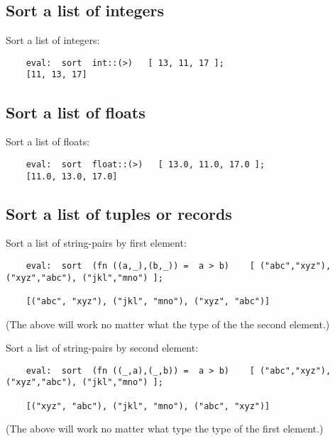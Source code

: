 \cutend*

\subsection{Sort a list of integers}

Sort a list of integers:
\begin{verbatim}
    eval:  sort  int::(>)   [ 13, 11, 17 ];
    [11, 13, 17]
\end{verbatim}

\cutend*

\subsection{Sort a list of floats}

Sort a list of floats:
\begin{verbatim}
    eval:  sort  float::(>)   [ 13.0, 11.0, 17.0 ];
    [11.0, 13.0, 17.0]
\end{verbatim}

\cutend*

\subsection{Sort a list of tuples or records}

Sort a list of string-pairs by first element:
\begin{verbatim}
    eval:  sort  (fn ((a,_),(b,_)) =  a > b)    [ ("abc","xyz"), ("xyz","abc"), ("jkl","mno") ];

    [("abc", "xyz"), ("jkl", "mno"), ("xyz", "abc")]
\end{verbatim}
(The above will work no matter what the type of the the second element.)

Sort a list of string-pairs by second element:
\begin{verbatim}
    eval:  sort  (fn ((_,a),(_,b)) =  a > b)    [ ("abc","xyz"), ("xyz","abc"), ("jkl","mno") ];

    [("xyz", "abc"), ("jkl", "mno"), ("abc", "xyz")]
\end{verbatim}
(The above will work no matter what type the type of the first element.)

